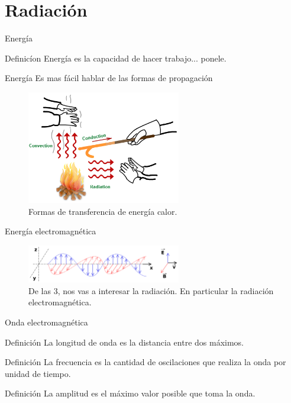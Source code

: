 \documentclass[]{article}
\begin{document}
\section{Radiación}
\label{sec:radiacion}
\begin{frame}{Energía}
  \begin{block}{Definicíon}
    Energía es la capacidad de hacer trabajo... \pause ponele.
  \end{block}
\end{frame}

\begin{frame}{Energía}
  Es mas fácil hablar de las formas de propagación
  \begin{figure}
    \includegraphics[width=0.6\textwidth]{imagenes/types-of-heat-transfer.png}
    \caption{Formas de transferencia de energía calor.}
  \end{figure}
\end{frame}


\begin{frame}{Energía electromagnética}
  \begin{figure}
    \includegraphics[width=0.6\textwidth]{imagenes/Onde_electromagnetique.png}
    \caption{De las 3, nos vas a interesar la radiación. En particular la radiación electromagnética.}
  \end{figure}
\end{frame}

\begin{frame}{Onda electromagnética}
  \begin{block}{Definición}
    La longitud de onda es la distancia entre dos máximos.
  \end{block}
  \begin{block}{Definición}
    La frecuencia es la cantidad de oscilaciones que realiza la onda por unidad de tiempo.
  \end{block}\pause
  \begin{block}{Definición}
    La amplitud es el máximo valor posible que toma la onda.
  \end{block}
\end{frame}
\end{document}
